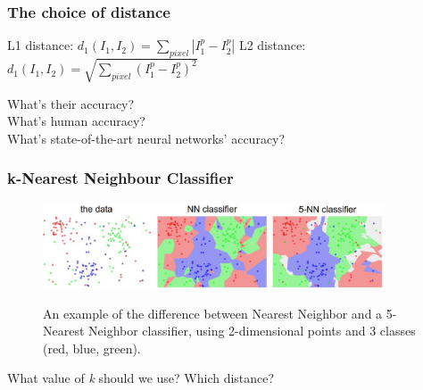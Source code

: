 \begin{frame}
	\frametitle{The choice of distance}

	L1 distance: $d_1(I_1,I_2)= \sum_{pixel} |I_1^p - I_2^p|$
	\vskip 0.5cm
	L2 distance: $d_1(I_1,I_2)= \sqrt{ \sum_{pixel} (I_1^p - I_2^p)^2 } $

	\vskip 1cm

	What's their accuracy?\\
	What's human accuracy?\\
	What's state-of-the-art neural networks' accuracy?

\end{frame}

\begin{frame}
	\frametitle{k-Nearest Neighbour Classifier}

	\centering
        \begin{figure}
                \includegraphics[width=0.9\textwidth]{Pics/knn.jpeg} \\
                \tiny{\caption{An example of the difference between Nearest Neighbor and a 5-Nearest Neighbor classifier, using 2-dimensional points and 3 classes (red, blue, green).}}
        \end{figure}

	What value of \textit{k} should we use? Which distance?

\end{frame}

